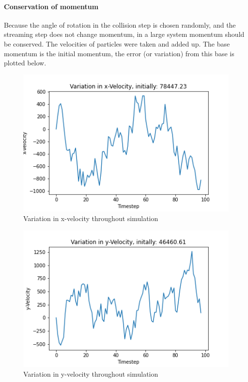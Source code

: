 \documentclass[
]{article}
\begin{document}
\hypertarget{conservation-of-momentum}{%
\paragraph{Conservation of momentum}\label{conservation-of-momentum}}

Because the angle of rotation in the collision step is chosen randomly,
and the streaming step does not change momentum, in a large system
momentum should be conserved. The velocities of particles were taken and
added up. The base momentum is the initial momentum, the error (or
variation) from this base is plotted below.

\begin{figure}
\centering
\includegraphics{Assets/x_velocity_variation.png}
\caption{Variation in x-velocity throughout simulation}
\end{figure}

\begin{figure}
\centering
\includegraphics{Assets/y_velocity_variation.png}
\caption{Variation in y-velocity throughout simulation}
\end{figure}
\end{document}
